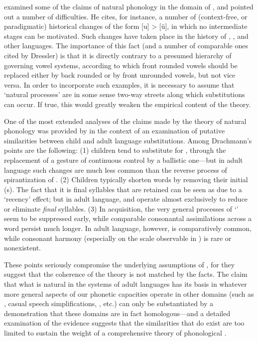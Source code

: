 \citet{dressler74:puzzles} examined some of the claims of natural
phonology in the domain of , and pointed out a number
of difficulties. He cites, for instance, a number of (context-free, or
paradigmatic) historical changes of the form [u] > [ü], in which no
intermediate stages can be motivated. Such changes have taken place in
the history of , , and other languages. The importance
of this fact (and a number of comparable ones cited by Dressler) is
that it is directly contrary to a presumed hierarchy of 
governing vowel systems, according to which front rounded vowels
should be replaced either by back rounded or by front unrounded
vowels, but not vice versa. In order to incorporate such examples, it
is necessary to assume that `natural processes' are in some sense
two-way streets along which substitutions can occur. If true, this
would greatly weaken the empirical content of the theory.

One of the most extended analyses of the claims made by the theory of
natural phonology was provided by \citet{drachmann:kindersprache} in
the context of an examination of putative similarities between child
and adult language substitutions. Among Drachmann's points are the
following: (1) children tend to substitute  for ,
through the replacement of a gesture of continuous control by a
ballistic one—but in adult language such changes are much less common
than the reverse process of spirantization of . (2) Children
typically shorten words by removing their initial (s). The
fact that it is final syllables that are retained can be seen as due
to a `recency' effect; but in adult language,  and
 operate almost exclusively to reduce or eliminate
\textit{final} syllables. (3) In  acquisition, the very
general processes of `' seem to be suppressed early,
while comparable consonantal assimilations across a word persist much
longer. In adult language, however,  is comparatively
common, while consonant harmony (especially on the scale observable in
) is rare or nonexistent.

These points seriously compromise the underlying assumptions of
, for they suggest that the coherence of the theory
is not matched by the facts. The claim that what is natural in the
systems of adult languages has its basis in whatever more general
aspects of our phonetic capacities operate in other domains (such as
, casual speech simplifications, ,
etc.) can only be substantiated by a demonstration that these domains
are in fact homologous—and a detailed examination of the evidence
suggests that the similarities that do exist are too limited to
sustain the weight of a comprehensive theory of phonological
.

